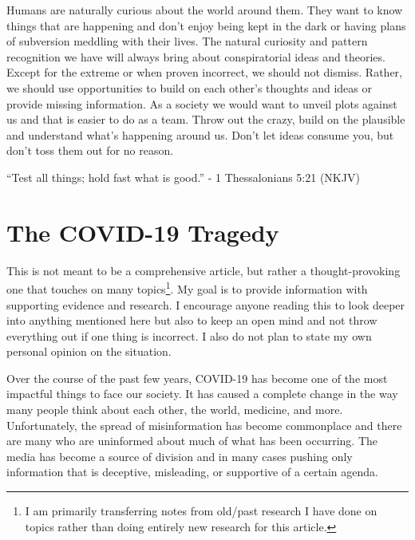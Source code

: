 \documentclass[10pt, a4paper, twocolumn]{book}
\begin{document}
Humans are naturally curious about the world around them. They want to know things that are happening and don't enjoy being kept in the dark or having plans of subversion meddling with their lives. The natural curiosity and pattern recognition we have will always bring about conspiratorial ideas and theories. Except for the extreme or when proven incorrect, we should not dismiss. Rather, we should use opportunities to build on each other's thoughts and ideas or provide missing information. As a society we would want to unveil plots against us and that is easier to do as a team. Throw out the crazy, build on the plausible and understand what's happening around us. Don't let ideas consume you, but don't toss them out for no reason.

\begin{formal}
	``Test all things; hold fast what is good.'' - 1 Thessalonians 5:21 (NKJV)
\end{formal}




















\sectionEnd

\section{The COVID-19 Tragedy}

This is not meant to be a comprehensive article, but rather a thought-provoking one that touches on many topics\footnote{I am primarily transferring notes from old/past research I have done on topics rather than doing entirely new research for this article.}. My goal is to provide information with supporting evidence and research. I encourage anyone reading this to look deeper into anything mentioned here but also to keep an open mind and not throw everything out if one thing is incorrect. I also do not plan to state my own personal opinion on the situation. 

Over the course of the past few years, COVID-19 has become one of the most impactful things to face our society. It has caused a complete change in the way many people think about each other, the world, medicine, and more. Unfortunately, the spread of misinformation has become commonplace and there are many who are uninformed about much of what has been occurring. The media has become a source of division and in many cases pushing only information that is deceptive, misleading, or supportive of a certain agenda. 
\end{document}
